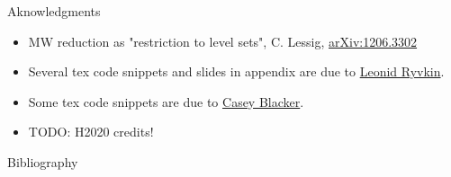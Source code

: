 \documentclass[beamer,10pt]{standalone}
\begin{document}


\begin{frame}[t,allowframebreaks]{Aknowledgments}
	\begin{itemize}[label=$\star$]
		\item MW reduction as "restriction to level sets", C. Lessig,
			\href{https://arxiv.org/abs/1206.3302}{arXiv:1206.3302}
		\item Several tex code snippets and slides in appendix are due to \href{https://www.ryvkin.eu/}{Leonid Ryvkin}.
		\item Some tex code snippets are due to \href{https://math.gmu.edu/~cblacke/}{Casey Blacker}.
		\item TODO: H2020 credits!
		
	\end{itemize}
\end{frame}



\begin{frame}[t,allowframebreaks]{Bibliography}
	\nocite{Miti2025}
	\printbibliography
\end{frame}


\end{document}
